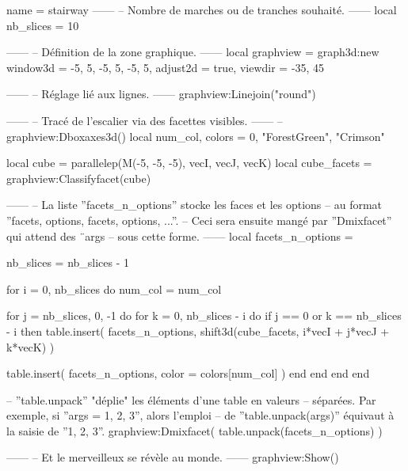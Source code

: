 \documentclass[border = 3pt]{standalone}
\begin{document}
\begin{luadraw}{name = stairway}
------
-- Nombre de marches ou de tranches souhaité.
------
local nb_slices = 10

------
-- Définition de la zone graphique.
------
local graphview = graph3d:new{
  window3d = {-5, 5, -5, 5, -5, 5},
  adjust2d = true,
  viewdir  = {-35, 45}
}

------
-- Réglage lié aux lignes.
------
graphview:Linejoin("round")

------
-- Tracé de l'escalier via des facettes visibles.
------
-- graphview:Dboxaxes3d()
local num_col, colors = 0, {"ForestGreen", "Crimson"}

local cube        = parallelep(M(-5, -5, -5), vecI, vecJ, vecK)
local cube_facets = graphview:Classifyfacet(cube)

------
-- La liste ''facets_n_options'' stocke les faces et les options
-- au format ''{facets, options, facets, options, ...}''.
-- Ceci sera ensuite mangé par ''Dmixfacet'' qui attend des ¨args
-- sous cette forme.
------
local facets_n_options = {}

nb_slices = nb_slices - 1

for i = 0, nb_slices do
  num_col = num_col%

  for j = nb_slices, 0, -1 do
    for k = 0, nb_slices - i do
      if j == 0 or k == nb_slices - i then
        table.insert(
          facets_n_options,
          shift3d(cube_facets, i*vecI + j*vecJ + k*vecK)
        )

        table.insert(
          facets_n_options,
          {
            color = colors[num_col]
          })
      end
    end
  end
end

-- ''table.unpack'' "déplie" les éléments d'une table en valeurs
-- séparées. Par exemple, si ''args = {1, 2, 3}'', alors l'emploi
-- de ''table.unpack(args)'' équivaut à la saisie de ''1, 2, 3''.
graphview:Dmixfacet( table.unpack(facets_n_options) )

------
-- Et le merveilleux se révèle au monde.
------
graphview:Show()
\end{luadraw}
\end{document}
